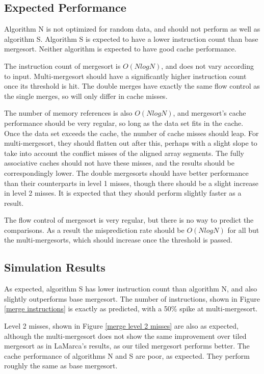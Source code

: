 \subsection{Expected Performance}

Algorithm N is not optimized for random data, and should not perform as well as
algorithm S. Algorithm S is expected to have a lower instruction count than base
mergesort. Neither algorithm is expected to have good cache performance.


The instruction count of mergesort is $O(NlogN)$, and does not vary
according to input. Multi-mergesort should have a significantly higher
instruction count once its threshold is hit. The double merges have exactly the
same flow control as the single merges, so will only differ in cache misses.

The number of memory references is also $O(NlogN)$, and mergesort's cache
performance should be very regular, so long as the data set fits in the cache. Once
the data set exceeds the cache, the number of cache misses should leap. For
multi-mergesort, they should flatten out after this, perhaps with a slight
slope to take into account the conflict misses of the aligned array segments. The
fully associative caches should not have these misses, and the results should be
correspondingly lower. The double mergesorts should have
better performance than their counterparts in level 1 misses, though there
should be a slight increase in level 2 misses. It is expected that they should
perform slightly faster as a result.

The flow control of mergesort is very regular, but there is no way to predict
the comparisons. As a result the misprediction rate should be $O(NlogN)$ for
all but the multi-mergesorts, which should increase once the threshold is
passed.

\subsection{Simulation Results}
\label{Mergesort results}


As expected, algorithm S has lower instruction count than algorithm N, and 
also slightly outperforms base mergesort.  The number of instructions, shown in
Figure \ref{merge instructions} is exactly as predicted, with a 50\% spike at
multi-mergesort. 

Level 2 misses, shown in Figure \ref{merge level 2 misses} are
also as expected, although the multi-mergesort does not show the same
improvement over tiled mergesort as in LaMarca's results, as our tiled mergesort
performs better. The cache performance of algorithms N and S are poor, as
expected. They perform roughly the same as base mergesort.

